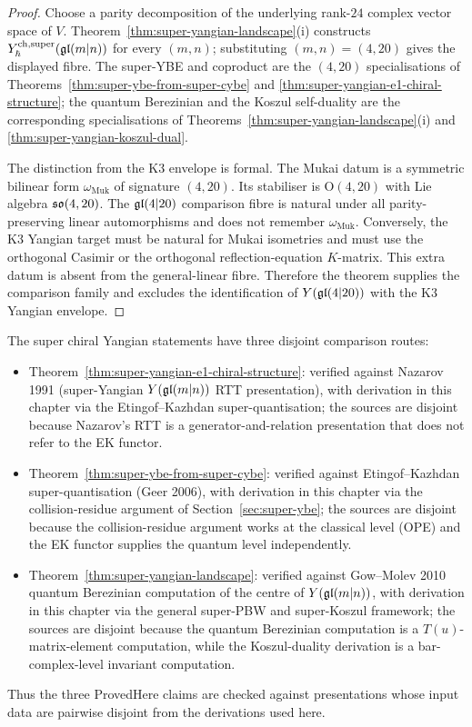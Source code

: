 \begin{proof}
Choose a parity decomposition of the underlying rank-$24$ complex
vector space of $V$. Theorem~\ref{thm:super-yangian-landscape}(i)
constructs $Y^{\mathrm{ch},\mathrm{super}}_{\hbar}(\mathfrak{gl}(m|n))$ for every $(m,n)$; substituting
$(m,n)=(4,20)$ gives the displayed fibre. The super-YBE and coproduct
are the $(4,20)$ specialisations of
Theorems~\ref{thm:super-ybe-from-super-cybe} and
\ref{thm:super-yangian-e1-chiral-structure}; the quantum Berezinian
and the Koszul self-duality are the corresponding specialisations of
Theorems~\ref{thm:super-yangian-landscape}(i) and
\ref{thm:super-yangian-koszul-dual}.

The distinction from the K3 envelope is formal. The Mukai datum is a
symmetric bilinear form $\omega_{\mathrm{Muk}}$ of signature $(4,20)$.
Its stabiliser is $\mathrm{O}(4,20)$ with Lie algebra $\mathfrak{so}(4,20)$.
The $\mathfrak{gl}(4|20)$ comparison fibre is natural under all
parity-preserving linear automorphisms and does not remember
$\omega_{\mathrm{Muk}}$. Conversely, the K3 Yangian target must be
natural for Mukai isometries and must use the orthogonal Casimir or the
orthogonal reflection-equation $K$-matrix. This extra datum is absent
from the general-linear fibre. Therefore the theorem supplies the
comparison family and excludes the identification of
$Y(\mathfrak{gl}(4|20))$ with the K3 Yangian envelope.
\end{proof}

\begin{remark}
\label{rem:iv-decorator}
The super chiral Yangian statements have three disjoint comparison
routes:
\begin{itemize}
\item Theorem~\ref{thm:super-yangian-e1-chiral-structure}: verified
 against Nazarov 1991 (super-Yangian $Y(\mathfrak{gl}(m|n))$ RTT presentation),
 with derivation in this chapter via the Etingof--Kazhdan
 super-quantisation; the sources are disjoint because Nazarov's RTT is
 a generator-and-relation presentation that does not refer to the EK
 functor.
\item Theorem~\ref{thm:super-ybe-from-super-cybe}: verified against
 Etingof--Kazhdan super-quantisation (Geer 2006), with derivation in
 this chapter via the collision-residue argument of
 Section~\ref{sec:super-ybe}; the sources are disjoint because the
 collision-residue argument works at the classical level (OPE) and
 the EK functor supplies the quantum level independently.
\item Theorem~\ref{thm:super-yangian-landscape}: verified against
 Gow--Molev 2010 quantum Berezinian computation of the centre of
 $Y(\mathfrak{gl}(m|n))$, with derivation in this chapter via the general
 super-PBW and super-Koszul framework; the sources are disjoint
 because the quantum Berezinian computation is a $T(u)$-matrix-element
 computation, while the Koszul-duality derivation is a
 bar-complex-level invariant computation.
\end{itemize}
Thus the three ProvedHere claims are checked against presentations
whose input data are pairwise disjoint from the derivations used here.
\end{remark}

